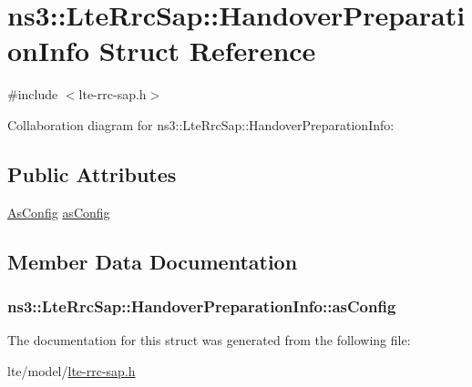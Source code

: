 \hypertarget{structns3_1_1LteRrcSap_1_1HandoverPreparationInfo}{}\section{ns3\+:\+:Lte\+Rrc\+Sap\+:\+:Handover\+Preparation\+Info Struct Reference}
\label{structns3_1_1LteRrcSap_1_1HandoverPreparationInfo}


{\ttfamily \#include $<$lte-\/rrc-\/sap.\+h$>$}



Collaboration diagram for ns3\+:\+:Lte\+Rrc\+Sap\+:\+:Handover\+Preparation\+Info\+:
\subsection*{Public Attributes}
\begin{DoxyCompactItemize}
\item 
\hyperlink{structns3_1_1LteRrcSap_1_1AsConfig}{As\+Config} \hyperlink{structns3_1_1LteRrcSap_1_1HandoverPreparationInfo_ada81e3cab2aba473d2cdd8b142c638e6}{as\+Config}
\end{DoxyCompactItemize}


\subsection{Member Data Documentation}
\subsubsection[{\texorpdfstring{as\+Config}{asConfig}}]{ ns3\+::\+Lte\+Rrc\+Sap\+::\+Handover\+Preparation\+Info\+::as\+Config}\hypertarget{structns3_1_1LteRrcSap_1_1HandoverPreparationInfo_ada81e3cab2aba473d2cdd8b142c638e6}{}\label{structns3_1_1LteRrcSap_1_1HandoverPreparationInfo_ada81e3cab2aba473d2cdd8b142c638e6}


The documentation for this struct was generated from the following file\+:\begin{DoxyCompactItemize}
\item 
lte/model/\hyperlink{lte-rrc-sap_8h}{lte-\/rrc-\/sap.\+h}\end{DoxyCompactItemize}
